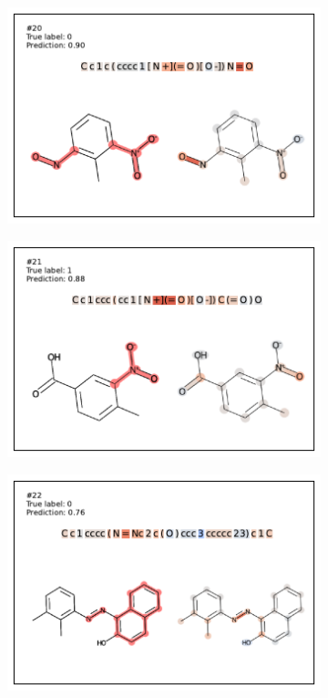 \begin{figure}
\begin{subfigure}[b]{0.33\textwidth}
\end{subfigure} 
\begin{subfigure}[b]{0.33\textwidth} 
  \centering 
  \includegraphics[width=\textwidth]{figures/ames/ames20.pdf} 
\end{subfigure}\begin{subfigure}[b]{0.33\textwidth} 
  \centering 
  \includegraphics[width=\textwidth]{figures/ames/ames21.pdf} 
\end{subfigure}\begin{subfigure}[b]{0.33\textwidth} 
  \centering 
  \includegraphics[width=\textwidth]{figures/ames/ames22.pdf} 

\end{subfigure}
\end{figure}
